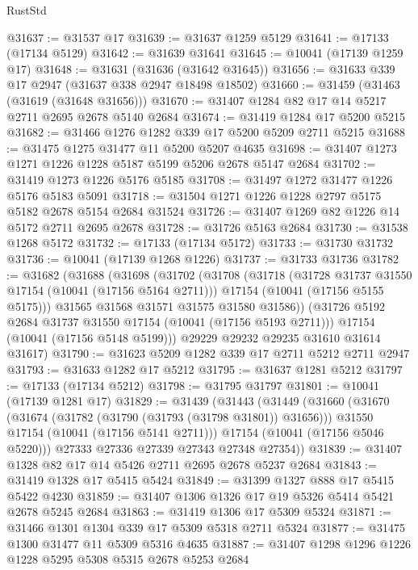 \begin{lexlean}{RustStd}
\begin{coremodule}
@31637 := @31537 @17
@31639 := @31637 @1259 @5129
@31641 := @17133 (@17134 @5129)
@31642 := @31639 @31641
@31645 := @10041 (@17139 @1259 @17)
@31648 := @31631 (@31636 (@31642 @31645))
@31656 := @31633 @339 @17 @2947 (@31637 @338 @2947 @18498 @18502)
@31660 := @31459 (@31463 (@31619 (@31648 @31656)))
@31670 := @31407 @1284 @82 @17 @14 @5217 @2711 @2695 @2678 @5140 @2684
@31674 := @31419 @1284 @17 @5200 @5215
@31682 := @31466 @1276 @1282 @339 @17 @5200 @5209 @2711 @5215
@31688 := @31475 @1275 @31477 @11 @5200 @5207 @4635
@31698 := @31407 @1273 @1271 @1226 @1228 @5187 @5199 @5206 @2678 @5147 @2684
@31702 := @31419 @1273 @1226 @5176 @5185
@31708 := @31497 @1272 @31477 @1226 @5176 @5183 @5091
@31718 := @31504 @1271 @1226 @1228 @2797 @5175 @5182 @2678 @5154 @2684 @31524
@31726 := @31407 @1269 @82 @1226 @14 @5172 @2711 @2695 @2678
@31728 := @31726 @5163 @2684
@31730 := @31538 @1268 @5172
@31732 := @17133 (@17134 @5172)
@31733 := @31730 @31732
@31736 := @10041 (@17139 @1268 @1226)
@31737 := @31733 @31736
@31782 := @31682
    (@31688
      (@31698
        (@31702
          (@31708
            (@31718
              (@31728 @31737 @31550 @17154 (@10041 (@17156 @5164 @2711)))
              @17154
              (@10041 (@17156 @5155 @5175)))
            @31565
            @31568
            @31571
            @31575
            @31580
            @31586))
        (@31726 @5192 @2684 @31737 @31550 @17154 (@10041 (@17156 @5193 @2711)))
        @17154
        (@10041 (@17156 @5148 @5199)))
      @29229
      @29232
      @29235
      @31610
      @31614
      @31617)
@31790 := @31623 @5209 @1282 @339 @17 @2711 @5212 @2711 @2947
@31793 := @31633 @1282 @17 @5212
@31795 := @31637 @1281 @5212
@31797 := @17133 (@17134 @5212)
@31798 := @31795 @31797
@31801 := @10041 (@17139 @1281 @17)
@31829 := @31439
    (@31443
      (@31449
        (@31660
          (@31670
            (@31674 (@31782 (@31790 (@31793 (@31798 @31801)) @31656)))
            @31550
            @17154
            (@10041 (@17156 @5141 @2711)))
          @17154
          (@10041 (@17156 @5046 @5220)))
        @27333
        @27336
        @27339
        @27343
        @27348
        @27354))
@31839 := @31407 @1328 @82 @17 @14 @5426 @2711 @2695 @2678 @5237 @2684
@31843 := @31419 @1328 @17 @5415 @5424
@31849 := @31399 @1327 @888 @17 @5415 @5422 @4230
@31859 := @31407 @1306 @1326 @17 @19 @5326 @5414 @5421 @2678 @5245 @2684
@31863 := @31419 @1306 @17 @5309 @5324
@31871 := @31466 @1301 @1304 @339 @17 @5309 @5318 @2711 @5324
@31877 := @31475 @1300 @31477 @11 @5309 @5316 @4635
@31887 := @31407 @1298 @1296 @1226 @1228 @5295 @5308 @5315 @2678 @5253 @2684

\end{coremodule}
\end{lexlean}
